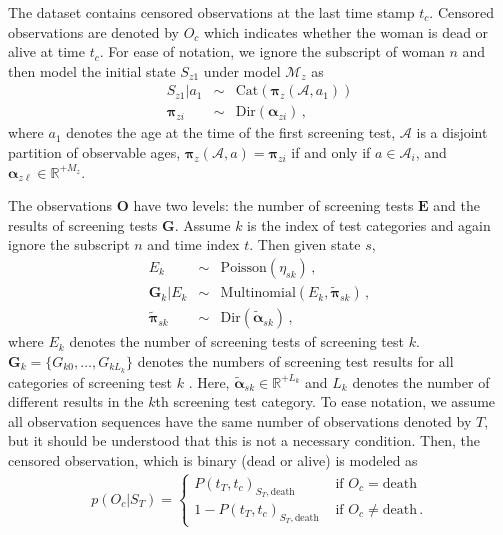 \documentclass{article}
\begin{document}
The dataset contains censored observations at the last time stamp $t_{c}$. Censored observations are denoted by $O_{c}$ which indicates whether the woman is dead or alive at time $t_c$. For ease of notation, we ignore the subscript of woman $n$ and then model the initial state $S_{z1}$ under model $\mathcal{M}_z$ as 
\begin{eqnarray*}
	S_{z1}|a_1 & \sim & \mathrm{Cat}(\bm \pi_z(\mathcal{A}, a_1)) \\
	\bm \pi_{zi} & \sim & \mathrm{Dir}(\bm \alpha_{zi})\,,
\end{eqnarray*}
where $a_1$ denotes the age at the time of the first screening test, $\mathcal{A}$ is a disjoint partition of observable ages, $\bm \pi_z(\mathcal{A}, a) = \bm \pi_{zi}$ if and only if $a \in \mathcal{A}_{i}$, and $\bm{\alpha}_{z\ell} \in \mathbb{R}^{+M_z}$.

The observations $\bm O$ have two levels: the number of screening tests $\bm E$ and the results of screening tests $\bm G$. Assume $k$ is the index of test categories and again ignore the subscript $n$ and time index $t$. Then given state $s$,  
\begin{eqnarray*}
	E_k & \sim & \mathrm{Poisson}(\eta_{sk})\,, \nonumber \\
	{\bm G}_k|E_k & \sim & \mathrm{Multinomial}(E_k, \tilde{\bm\pi}_{sk})\,, \nonumber \\
	\tilde{\bm\pi}_{sk} & \sim & \mathrm{Dir}(\tilde{\bm\alpha}_{sk}) \,,
\end{eqnarray*}
where $E_k$ denotes the number of screening tests of screening test $k$. $\bm G_k = \{G_{k0}, \ldots, G_{kL_k} \}$ denotes the numbers of screening test results for all categories of screening test $k$ . Here, 
$\tilde{\bm \alpha}_{sk} \in \mathbb{R}^{+L_k}$
and $L_k$ denotes the number of different results in the $k$th screening test category. To ease notation, we assume all observation sequences have the same number of observations denoted by $T$, but it should be understood that this is not a necessary condition. Then, the censored observation, which is binary (dead or alive) is modeled as
\begin{eqnarray*}
	p(O_{c}|S_T) = \begin{cases}
		P(t_T, t_{c})_{S_T, \text{death}} & \text{ if } O_{c} = \mathrm{death}\\
		1-P(t_T, t_{c})_{S_T, \text{death}} &   \text{ if }  O_{c} \neq \mathrm{death}\,.
	\end{cases}
\end{eqnarray*}
\end{document}
